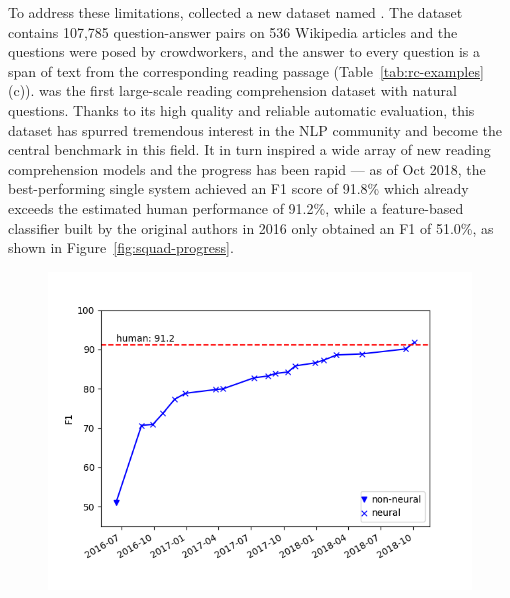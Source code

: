To address these limitations,  collected a new dataset named . The dataset contains 107,785 question-answer pairs on 536 Wikipedia articles and the questions were posed by crowdworkers, and the answer to every question is a span of text from the corresponding reading passage (Table~\ref{tab:rc-examples} (c)).  was the first large-scale reading comprehension dataset with natural questions. Thanks to its high quality and reliable automatic evaluation, this dataset has spurred tremendous interest in the NLP community and become the central benchmark in this field. It in turn inspired a wide array of new reading comprehension models \cite{wang2017machine,seo2017bidirectional,chen2017reading,wang2017gated,yu2018qanet} and the progress has been rapid --- as of Oct 2018, the best-performing single system achieved an F1 score of 91.8\% \cite{devlin2018bert} which already exceeds the estimated human performance of 91.2\%, while a feature-based classifier built by the original authors in 2016 only obtained an F1 of 51.0\%, as shown in Figure~\ref{fig:squad-progress}.

\begin{figure}[!t]
\center
\includegraphics[scale=0.8]{img/squad_progress.png}
\end{figure}

